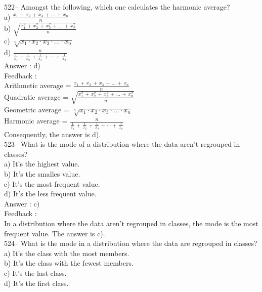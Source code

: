 ﻿\documentclass[letterpaper, 12pt]{article}
\begin{document}
522-- Amongst the following, which one calculates the harmonic average?\\
a) $\frac{x_1\,+\,x_2\,+\,x_3\,+\,\ldots\,+\,x_n}{n}$\\[2mm]
b)
$\sqrt{\frac{x_1^{2}\,+\,x_2^{2}\,+\,x_3^{2}\,+\,\ldots\,+\,x_n^{2}}{n}}$\\[2mm]
c) $\sqrt[n]{x_1 \cdot x_2 \cdot x_3 \cdot \ldots \cdot x_n}$\\[2mm]
d)
$\frac{n}{\frac{1}{x_1}\,+\,\frac{1}{x_2}\,+\,\frac{1}{x_3}\,+\,\cdots\,+\,\frac{1}{x_n}}$\\

Answer : d)\\

Feedback : \\
Arithmetic average =
$\frac{x_1\,+\,x_2\,+\,x_3\,+\,\ldots\,+\,x_n}{n}$\\[2mm]
Quadratic average =
$\sqrt{\frac{x_1^{2}\,+\,x_2^{2}\,+\,x_3^{2}\,+\,\ldots\,+\,x_n^{2}}{n}}$\\[2mm]
Geometric average = $\sqrt[n]{x_1\cdot x_2\cdot x_3 \cdot \ldots \cdot
x_n}$\\[2mm]
Harmonic average =
$\frac{n}{\frac{1}{x_1}\,+\,\frac{1}{x_2}\,+\,\frac{1}{x_3}\,+\,\cdots\,+\,\frac{1}{x_n}}$\\[2mm]
Consequently, the answer is d).\\

523-- What is the mode of a distribution where the data aren't regrouped in classes?\\
a) It's the highest value.\\
b) It's the smalles value.\\
c) It's the most frequent value.\\
d) It's the less frequent value.\\

Answer : c)\\

Feedback : \\
In a distribution where the data aren't regrouped in classes, the mode is the most frequent value.  The answer is c).\\

524-- What is the mode in a distribution where the data are regrouped in classes?\\
a) It's the class with the most members.\\
b) It's the class with the fewest members.\\
c) It's the last class.\\
d) It's the first class.\\
\end{document}
